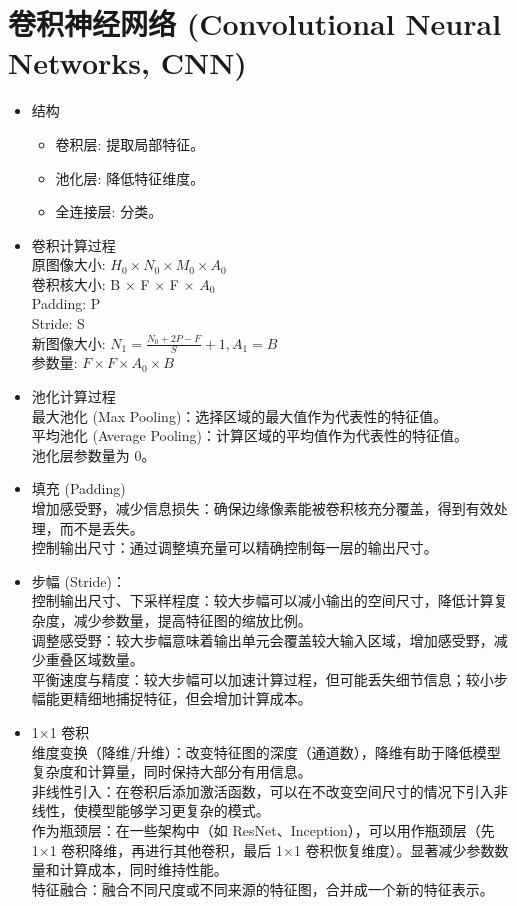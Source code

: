 \documentclass[
12pt, %
a4paper, 
oneside, %
headinclude,footinclude, %
]{scrartcl}
\begin{document}
\section{卷积神经网络 (Convolutional Neural Networks, CNN)}
\begin{itemize}
\item 结构
\begin{itemize}
\item 卷积层: 提取局部特征。
\item 池化层: 降低特征维度。
\item 全连接层: 分类。
\end{itemize}
    
\item 卷积计算过程\\
原图像大小: $H_0 \times N_0 \times M_0 \times A_0$\\
卷积核大小: B × F × F × $A_0$\\
Padding: P\\
Stride: S\\
新图像大小: $N_1 = \frac{N_0+2P-F}{S}+1, A_1 = B$\\
参数量: $F \times F \times A_0 \times B$
    
\item 池化计算过程\\
最大池化 (Max Pooling)：选择区域的最大值作为代表性的特征值。\\
平均池化 (Average Pooling)：计算区域的平均值作为代表性的特征值。\\
池化层参数量为 0。
    
\item 填充 (Padding)\\
增加感受野，减少信息损失：确保边缘像素能被卷积核充分覆盖，得到有效处理，而不是丢失。\\
控制输出尺寸：通过调整填充量可以精确控制每一层的输出尺寸。
    
\item 步幅 (Stride)：\\
控制输出尺寸、下采样程度：较大步幅可以减小输出的空间尺寸，降低计算复杂度，减少参数量，提高特征图的缩放比例。\\
调整感受野：较大步幅意味着输出单元会覆盖较大输入区域，增加感受野，减少重叠区域数量。\\
平衡速度与精度：较大步幅可以加速计算过程，但可能丢失细节信息；较小步幅能更精细地捕捉特征，但会增加计算成本。
    
\item 1×1 卷积\\
维度变换（降维/升维）：改变特征图的深度（通道数），降维有助于降低模型复杂度和计算量，同时保持大部分有用信息。\\
非线性引入：在卷积后添加激活函数，可以在不改变空间尺寸的情况下引入非线性，使模型能够学习更复杂的模式。\\
作为瓶颈层：在一些架构中（如 ResNet、Inception），可以用作瓶颈层（先 1×1 卷积降维，再进行其他卷积，最后 1×1 卷积恢复维度）。显著减少参数数量和计算成本，同时维持性能。\\
特征融合：融合不同尺度或不同来源的特征图，合并成一个新的特征表示。
\end{itemize}
\end{document}
